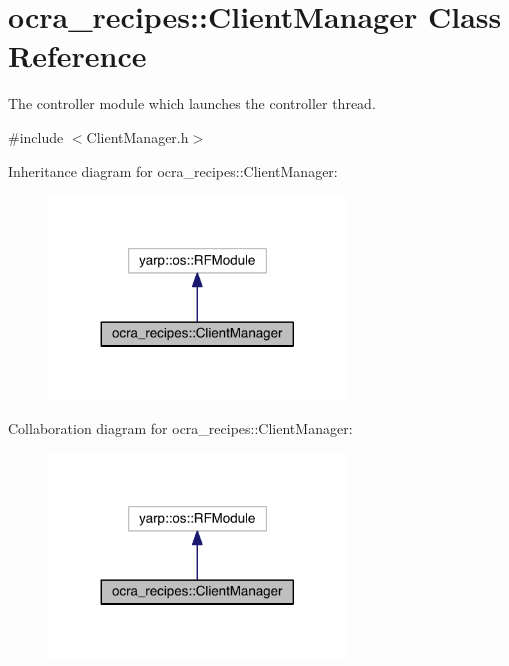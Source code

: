 \hypertarget{classocra__recipes_1_1ClientManager}{}\section{ocra\+\_\+recipes\+:\+:Client\+Manager Class Reference}
\label{classocra__recipes_1_1ClientManager}


The controller module which launches the controller thread.  




{\ttfamily \#include $<$Client\+Manager.\+h$>$}



Inheritance diagram for ocra\+\_\+recipes\+:\+:Client\+Manager\+:\nopagebreak
\begin{figure}[H]
\begin{center}
\leavevmode
\includegraphics[width=224pt]{d2/d4b/classocra__recipes_1_1ClientManager__inherit__graph}
\end{center}
\end{figure}


Collaboration diagram for ocra\+\_\+recipes\+:\+:Client\+Manager\+:\nopagebreak
\begin{figure}[H]
\begin{center}
\leavevmode
\includegraphics[width=224pt]{dc/de0/classocra__recipes_1_1ClientManager__coll__graph}
\end{center}
\end{figure}
